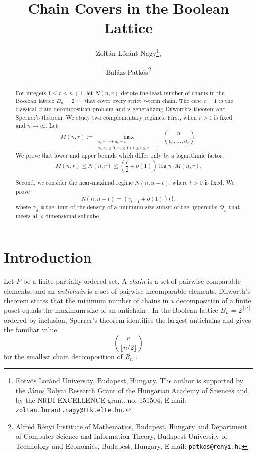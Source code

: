 \documentclass[11pt]{article}
\title{Chain Covers in the Boolean Lattice}
\author{Zolt\'an Lóránt Nagy\thanks{
 E\"otv\"os Lor\'and University, Budapest, Hungary. The author is supported by  the J\'anos Bolyai Research Grant of the Hungarian Academy of Sciences and  by the NRDI EXCELLENCE grant, no.  151504;   	E-mail: {\tt zoltan.lorant.nagy@ttk.elte.hu.}}, \and Balázs Patkós\thanks{Alfr\'ed R\'enyi Institute of Mathematics, Budapest, Hungary and Department of Computer Science and Information Theory, Budapest University of
Technology and Economics, Budapest, Hungary, E-mail: {\tt patkos@renyi.hu}}}
\date{}
\theoremstyle{definition}
\theoremstyle{remark}
\begin{document}
\maketitle

\begin{abstract}
For integers $1\le r\le n+1$, let $N(n,r)$ denote the least number of chains in the Boolean lattice $B_n=2^{[n]}$ that cover every strict $r$-term chain.  The case $r=1$ is the classical chain-decomposition problem and is generalizing Dilworth's theorem and Sperner's theorem.  We study two complementary regimes.  First, when $r>1$ is fixed and $n\to\infty$.
Let   $$M(n,r):= \max_{\substack{
      a_0+\cdots+a_r=n\\
      a_0,a_r\ge 0,\ a_i\ge 1\ (1\le i\le r-1)
   }}
   \binom{n}{a_0,\ldots,a_r}.$$
We prove that lower and upper bounds which differ only by a logarithmic factor:
\[
  M(n,r)\le   N(n,r)\le \left(\frac r2+o(1)\right)\log n\cdot
 M(n,r).
\]

Second, we consider the near-maximal regime $N(n,n-t)$, where $t>0$ is fixed.  We prove %
\[
   N(n,n-t)= (\gamma_{t-1}+o(1))n!,
\]
where $\gamma_d$ is the limit of the density of a minimum size subset of the hypercube $Q_n$ that meets all $d$-dimensional subcube.  
\end{abstract}

\section{Introduction}

Let $P$ be a finite partially ordered set.  A \emph{chain} is a set of pairwise comparable elements, and an \emph{antichain} is a set of pairwise incomparable elements.  Dilworth's theorem states that the minimum number of chains in a decomposition of a finite poset equals the maximum size of an antichain \citep{Dilworth1950}.  In the Boolean lattice $B_n=2^{[n]}$ ordered by inclusion, Sperner's theorem identifies the largest antichains and gives the familiar value
\[
   \binom{n}{\lfloor n/2\rfloor}
\]
for the smallest chain decomposition of $B_n$ \citep{Sperner1928}.
\end{document}

